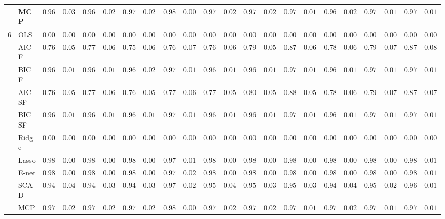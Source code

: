 \begin{tabular}{p{0.2cm}p{1cm}|p{0.6cm}p{0.6cm}|p{0.6cm}p{0.6cm}p{0.6cm}p{0.6cm}p{0.6cm}p{0.6cm}|p{0.6cm}p{0.6cm}p{0.6cm}p{0.6cm}p{0.6cm}p{0.6cm}|p{0.6cm}p{0.6cm}p{0.6cm}p{0.6cm}p{0.6cm}p{0.6cm}}
 & MCP  & $0.9679$ & $0.0357$ & $0.9633$ & $0.0278$ & $0.9722$ & $0.0228$ & $0.9824$ & $0.0095$ & $0.9725$ & $0.0268$ & $0.9781$ & $0.0253$ & $0.9746$ & $0.0193$ & $0.9651$ & $0.0286$ & $0.9745$ & $0.0183$ & $0.9786$ & $0.0138$ \\\hline
6 & OLS  & $0.0000$ & $0.0000$ & $0.0000$ & $0.0000$ & $0.0000$ & $0.0000$ & $0.0000$ & $0.0000$ & $0.0000$ & $0.0000$ & $0.0000$ & $0.0000$ & $0.0000$ & $0.0000$ & $0.0000$ & $0.0000$ & $0.0000$ & $0.0000$ & $0.0000$ & $0.0000$ \\
 & AIC F  & $0.7606$ & $0.0585$ & $0.7713$ & $0.0672$ & $0.7565$ & $0.0677$ & $0.7659$ & $0.0712$ & $0.7684$ & $0.0662$ & $0.7958$ & $0.0599$ & $0.8738$ & $0.0608$ & $0.7815$ & $0.0692$ & $0.7931$ & $0.0754$ & $0.8723$ & $0.0852$ \\
 & BIC F  & $0.9626$ & $0.0178$ & $0.9681$ & $0.0159$ & $0.9681$ & $0.0202$ & $0.9717$ & $0.0124$ & $0.9607$ & $0.0198$ & $0.9661$ & $0.0188$ & $0.9774$ & $0.0122$ & $0.9655$ & $0.0166$ & $0.9705$ & $0.0146$ & $0.9774$ & $0.0132$ \\
 & AIC SF  & $0.7664$ & $0.0560$ & $0.7766$ & $0.0646$ & $0.7674$ & $0.0590$ & $0.7749$ & $0.0690$ & $0.7777$ & $0.0581$ & $0.8015$ & $0.0570$ & $0.8805$ & $0.0557$ & $0.7877$ & $0.0629$ & $0.7997$ & $0.0707$ & $0.8774$ & $0.0763$ \\
 & BIC SF  & $0.9626$ & $0.0178$ & $0.9682$ & $0.0157$ & $0.9683$ & $0.0199$ & $0.9717$ & $0.0124$ & $0.9608$ & $0.0196$ & $0.9662$ & $0.0185$ & $0.9774$ & $0.0122$ & $0.9655$ & $0.0166$ & $0.9708$ & $0.0138$ & $0.9775$ & $0.0130$ \\
 & Ridge  & $0.0000$ & $0.0000$ & $0.0000$ & $0.0000$ & $0.0000$ & $0.0000$ & $0.0000$ & $0.0000$ & $0.0000$ & $0.0000$ & $0.0000$ & $0.0000$ & $0.0000$ & $0.0000$ & $0.0000$ & $0.0000$ & $0.0000$ & $0.0000$ & $0.0000$ & $0.0000$ \\
 & Lasso  & $0.9893$ & $0.0021$ & $0.9895$ & $0.0000$ & $0.9868$ & $0.0080$ & $0.9789$ & $0.0158$ & $0.9895$ & $0.0000$ & $0.9888$ & $0.0044$ & $0.9874$ & $0.0050$ & $0.9892$ & $0.0023$ & $0.9885$ & $0.0034$ & $0.9847$ & $0.0101$ \\
 & E-net  & $0.9893$ & $0.0021$ & $0.9894$ & $0.0011$ & $0.9862$ & $0.0099$ & $0.9725$ & $0.0243$ & $0.9895$ & $0.0000$ & $0.9888$ & $0.0044$ & $0.9863$ & $0.0068$ & $0.9892$ & $0.0023$ & $0.9883$ & $0.0039$ & $0.9815$ & $0.0149$ \\
 & SCAD  & $0.9491$ & $0.0470$ & $0.9448$ & $0.0376$ & $0.9458$ & $0.0304$ & $0.9700$ & $0.0205$ & $0.9509$ & $0.0411$ & $0.9557$ & $0.0383$ & $0.9596$ & $0.0302$ & $0.9471$ & $0.0411$ & $0.9536$ & $0.0244$ & $0.9667$ & $0.0176$ \\
 & MCP  & $0.9726$ & $0.0254$ & $0.9723$ & $0.0220$ & $0.9734$ & $0.0200$ & $0.9815$ & $0.0070$ & $0.9746$ & $0.0221$ & $0.9759$ & $0.0203$ & $0.9758$ & $0.0175$ & $0.9735$ & $0.0233$ & $0.9772$ & $0.0133$ & $0.9763$ & $0.0137$ \\
\hline 
\end{tabular}

